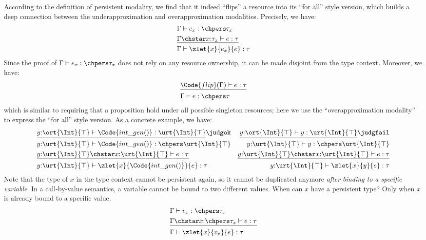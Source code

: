 According to the definition of persistent modality, we find that it indeed ``flips'' a resource into its ``for all'' style version, which builds a deep connection between the underapproximation and overapproximation modalities. Precisely, we have:
\begin{align*}
  &\Gamma \vdash e_x : \chpers \tau_x
  \\&\underline{\Gamma \chstar x{:}\tau_x \vdash e : \tau}
  \\&\Gamma \vdash \zlet{x}{e_x}{e} : \tau
\end{align*}\noindent
Since the proof of $\Gamma \vdash e_x : \chpers \tau_x$ does not rely on any resource ownership, it can be made disjoint from the type context. Moreover, we have:
\begin{align*}
  &\underline{\Code{flip}(\Gamma) \vdash e : \tau}
  \\&\Gamma \vdash e : \chpers \tau
\end{align*}\noindent
which is similar to requiring that a proposition hold under all possible singleton resources; here we use the ``overapproximation modality'' to express the ``for all'' style version. As a concrete example, we have:
\begin{align*}
  &\underline{y{:}\ort{\Int}{\top} \vdash \Code{int\_gen()} : \urt{\Int}{\top}} \judgok
  &\underline{y{:}\ort{\Int}{\top} \vdash y : \urt{\Int}{\top}} \judgfail
  \\&y{:}\urt{\Int}{\top} \vdash \Code{int\_gen()} : \chpers \urt{\Int}{\top}
  &y{:}\urt{\Int}{\top} \vdash y : \chpers \urt{\Int}{\top}
  \\&\underline{y{:}\urt{\Int}{\top} \chstar x{:}\urt{\Int}{\top} \vdash e : \tau}
  &\underline{y{:}\urt{\Int}{\top} \chstar x{:}\urt{\Int}{\top} \vdash e : \tau}
  \\&y{:}\urt{\Int}{\top} \vdash \zlet{x}{\Code{int\_gen()}}{e} : \tau
  &y{:}\urt{\Int}{\top} \vdash \zlet{x}{y}{e} : \tau
\end{align*}\noindent
Note that the type of $x$ in the type context cannot be persistent again, so it cannot be duplicated anymore \emph{after binding to a specific variable}. In a call-by-value semantics, a variable cannot be bound to two different values. When can $x$ have a persistent type? Only when $x$ is already bound to a specific value.
\begin{align*}
  &\Gamma \vdash v_x : \chpers \tau_x
  \\&\underline{\Gamma \chstar x{:}\chpers \tau_x \vdash e : \tau}
  \\&\Gamma \vdash \zlet{x}{v_x}{e} : \tau
\end{align*}\noindent
